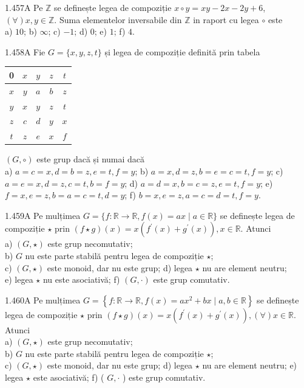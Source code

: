 \documentclass[11pt]{article}
\begin{document}
1.457A Pe $\mathbb{Z}$ se definește legea de compoziție $x \circ y=x y-2 x-2 y+6$, $(\forall) x, y \in \mathbb{Z}$. Suma elementelor inversabile din $\mathbb{Z}$ in raport cu legea $\circ$ este\\ a) $10$; b) $\infty$; c) $-1$; d) $0$; e) $1$; f) $4$.

1.458A Fie $G=\{x, y, z, t\}$ și legea de compoziție definită prin tabela \begin{center}\begin{tabular}{|c|c|c|c|c|}\hline0 & $x$ & $y$ & $z$ & $t$ \\\hline$x$ & $y$ & $a$ & $b$ & $z$ \\\hline$y$ & $x$ & $y$ & $z$ & $t$ \\\hline$z$ & $c$ & $d$ & $y$ & $x$ \\\hline$t$ & $z$ & $e$ & $x$ & $f$ \\\hline\end{tabular}\end{center}$(G, \circ)$ este grup dacă și numai dacă\\ a) $a=c=x, d=b=z, e=t, f=y$; b) $a=x, d=z, b=e=c=t, f=y$; c) $a=e=x, d=z, c=t, b=f=y$; d) $a=d=x, b=c=z, e=t, f=y$; e) $f=x, e=z, b=a=c=t, d=y$; f) $b=x, e=z, a=c=d=t, f=y$.

1.459A Pe mulțimea $G=\{f: \mathbb{R} \rightarrow \mathbb{R}, f(x)=a x \mid a \in \mathbb{R}\}$ se definește legea de compoziție $\star$ prin $(f \star g)(x)=x\left(f^{\prime}(x)+g^{\prime}(x)\right), x \in \mathbb{R}$. Atunci\\ a) $(G, \star)$ este grup necomutativ;\\ b) $G$ nu este parte stabilă pentru legea de compoziție $\star$;\\ c) $(G, \star)$ este monoid, dar nu este grup; d) legea $\star$ nu are element neutru;\\ e) legea $\star$ nu este asociativă; f) $(G, \cdot)$ este grup comutativ.

1.460A Pe mulțimea $G=\left\{f: \mathbb{R} \rightarrow \mathbb{R}, f(x)=a x^{2}+b x \mid a, b \in \mathbb{R}\right\}$ se definește legea de compoziție $\star$ prin $(f \star g)(x)=x\left(f^{\prime}(x)+g^{\prime}(x)\right),(\forall) x \in \mathbb{R}$. Atunci\\ a) $(G, \star)$ este grup necomutativ;\\ b) $G$ nu este parte stabilă pentru legea de compoziție $\star$;\\ c) $(G, \star)$ este monoid, dar nu este grup; d) legea $\star$ nu are element neutru; e) legea $\star$ este asociativă; f) ( $G, \cdot$ ) este grup comutativ.
\end{document}
